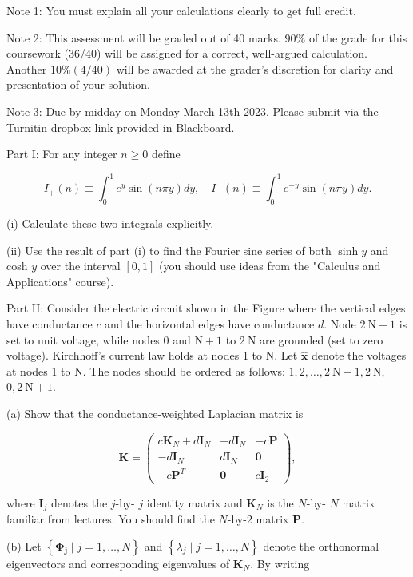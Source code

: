 \documentclass[10pt]{article}
\begin{document}
Note 1: You must explain all your calculations clearly to get full credit.

Note 2: This assessment will be graded out of 40 marks. $90 \%$ of the grade for this coursework (36/40) will be assigned for a correct, well-argued calculation. Another $10 \%(4 / 40)$ will be awarded at the grader's discretion for clarity and presentation of your solution.

Note 3: Due by midday on Monday March 13th 2023. Please submit via the Turnitin dropbox link provided in Blackboard.

Part I: For any integer $n \geq 0$ define

$$
I_{+}(n) \equiv \int_{0}^{1} e^{y} \sin (n \pi y) d y, \quad I_{-}(n) \equiv \int_{0}^{1} e^{-y} \sin (n \pi y) d y .
$$

(i) Calculate these two integrals explicitly.

(ii) Use the result of part (i) to find the Fourier sine series of both $\sinh y$ and cosh $y$ over the interval $[0,1]$ (you should use ideas from the "Calculus and Applications" course).

Part II: Consider the electric circuit shown in the Figure where the vertical edges have conductance $c$ and the horizontal edges have conductance $d$. Node $2 \mathrm{~N}+1$ is set to unit voltage, while nodes 0 and $\mathrm{N}+1$ to $2 \mathrm{~N}$ are grounded (set to zero voltage). Kirchhoff's current law holds at nodes 1 to $\mathrm{N}$. Let $\hat{\mathbf{x}}$ denote the voltages at nodes 1 to $\mathrm{N}$. The nodes should be ordered as follows: $1,2, \ldots, 2 \mathrm{~N}-1,2 \mathrm{~N}$, $0,2 \mathrm{~N}+1$.

(a) Show that the conductance-weighted Laplacian matrix is

$$
\mathbf{K}=\left(\begin{array}{ccc}
c \mathbf{K}_{N}+d \mathbf{I}_{N} & -d \mathbf{I}_{N} & -c \mathbf{P} \\
-d \mathbf{I}_{N} & d \mathbf{I}_{N} & \mathbf{0} \\
-c \mathbf{P}^{T} & \mathbf{0} & c \mathbf{I}_{2}
\end{array}\right),
$$

where $\mathbf{I}_{j}$ denotes the $j$-by- $j$ identity matrix and $\mathbf{K}_{N}$ is the $N$-by- $N$ matrix familiar from lectures. You should find the $N$-by-2 matrix $\mathbf{P}$.

(b) Let $\left\{\boldsymbol{\Phi}_{\mathbf{j}} \mid j=1, \ldots, N\right\}$ and $\left\{\lambda_{j} \mid j=1, \ldots, N\right\}$ denote the orthonormal eigenvectors and corresponding eigenvalues of $\mathbf{K}_{N}$. By writing
\end{document}
